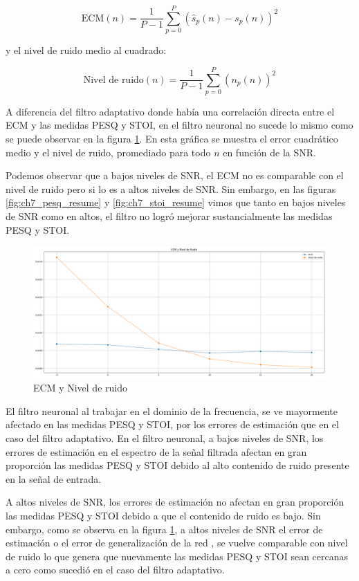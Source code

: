 \begin{equation*}
	\text{ECM}(n) = \frac{1}{P-1} \sum_{p=0}^{P} (\hat{s}_p(n) - s_p(n))^2
\end{equation*}

\noindent y el nivel de ruido medio al cuadrado:

\begin{equation*}
	\text{Nivel de ruido}(n) = \frac{1}{P-1} \sum_{p=0}^{P} (n_p(n))^2
\end{equation*}

A diferencia del filtro adaptativo donde había una correlación directa entre el ECM y las medidas PESQ y STOI, en el filtro neuronal no sucede lo mismo como se puede observar en la figura \ref{fig:ch7_mse_and_noise_level}. En esta gráfica se muestra el error cuadrático medio y el nivel de ruido, promediado para todo $n$ en función de la SNR. 

Podemos observar que a bajos niveles de SNR, el ECM no es comparable con el nivel de ruido pero si lo es a altos niveles de SNR. Sin embargo, en las figuras \ref{fig:ch7_pesq_resume} y \ref{fig:ch7_stoi_resume} vimos que tanto en bajos niveles de SNR como en altos, el filtro no logró mejorar sustancialmente las medidas PESQ y STOI.

\begin{figure}
	\centering
	\centerline{\includegraphics[scale=0.30]{images/ch7/ecm_and_noise_level.png}}
	\caption{ECM y Nivel de ruido}
	\label{fig:ch7_mse_and_noise_level}
\end{figure}


El filtro neuronal al trabajar en el dominio de la frecuencia, se ve mayormente afectado en las medidas PESQ y STOI, por los errores de estimación que en el caso del filtro adaptativo. En el filtro neuronal, a bajos niveles de SNR, los errores de estimación en el espectro de la señal filtrada  afectan en gran proporción las medidas PESQ y STOI debido al alto contenido de ruido presente en la señal de entrada.

A altos niveles de SNR, los errores de estimación no afectan en gran proporción las medidas PESQ y STOI debido a que el contenido de ruido es bajo. Sin embargo, como se observa en la figura \ref{fig:ch7_mse_and_noise_level}, a altos niveles de SNR el error de estimación o el error de generalización de la red \cite{deep_learning}, se vuelve comparable con nivel de ruido lo que genera que nuevamente las medidas PESQ y STOI sean cercanas a cero como sucedió en el caso del filtro adaptativo.